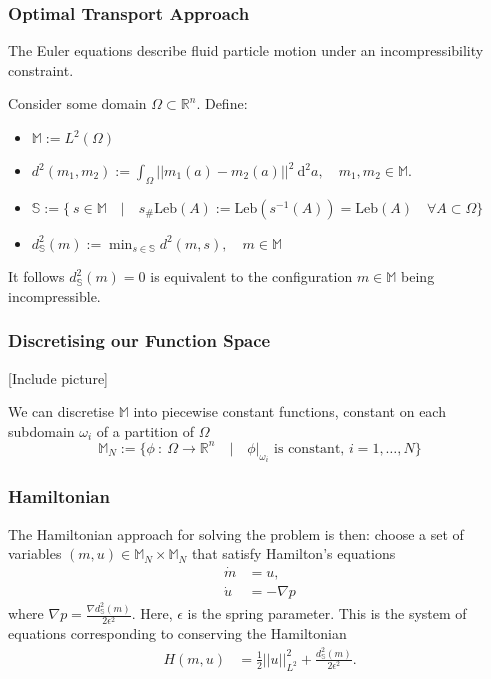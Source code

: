 \documentclass[10pt]{beamer}
\newcommand{\R}{\mathbb{R}}
\newcommand{\MN}{\mathbb{M}_N}
\newcommand{\dsmsq}{d^{2}_{\mathbb{S}}(m)}
\newcommand{\graddsmsq}{\nabla{d^{2}_{\mathbb{S}}(m)}}
\newcommand{\M}{\mathbb{M}}
\newcommand{\Sb}{\mathbb{S}}
\newcommand{\Leb}{\mathrm{Leb}}
\begin{document}
\frame
{
  \frametitle{Optimal Transport Approach}
  
\begin{block}{}
The Euler equations describe fluid particle motion under an incompressibility constraint.
\end{block} 

Consider some domain \(\Omega \subset \R^n\). Define:

\begin{itemize}

\item \(\M := L^2(\Omega)\)

\item \(d^2(m_1, m_2) := \int_\Omega || m_1(a) - m_2(a) ||^2 \: \mathrm{d}^2 a, \quad m_1, m_2 \in \M.\)

\item \(\Sb := \Big\{ \: s \in \M \quad | \quad s_{\#}\Leb(A) := \Leb(s^{-1}(A)) = \Leb(A) \quad \forall A \subset \Omega \Big\}\)

\item \(\dsmsq := \min_{s \in \mathbb{S}} d^2(m, s), \quad m \in \M\)

\end{itemize}

\begin{block}{}
It follows \(\dsmsq = 0\) is equivalent to the configuration \(m \in \M\) being incompressible.
\end{block}

}

\frame
{
  \frametitle{Discretising our Function Space}
  
[Include picture]  

We can discretise \(\M\) into piecewise constant functions, constant on each subdomain \(\omega_i\) of a partition of \(\Omega\)
\[ 
\MN := \Big\{ \phi \: : \: \Omega \to \R^n \quad | \quad \phi | _{\omega_i} \text{ is constant, } i = 1,\dots,N \Big\}
\]

}

\frame
{
  \frametitle{Hamiltonian}

The Hamiltonian approach for solving the problem is then: choose a set of variables \((m, u) \in \MN \times \MN \) that satisfy Hamilton's equations
\begin{align} 
\dot{m} &= u, \\
\dot{u} &= - \nabla p
\end{align}
where \(\nabla p = \frac{\graddsmsq}{2\epsilon^2}\). Here, \(\epsilon\) is the spring parameter. This is the system of equations corresponding to conserving the Hamiltonian
\begin{align} 
H(m, u) &= \frac{1}{2} ||u||^2_{L^2} + \frac{\dsmsq}{2\epsilon^2}.
\end{align}
}
\end{document}
